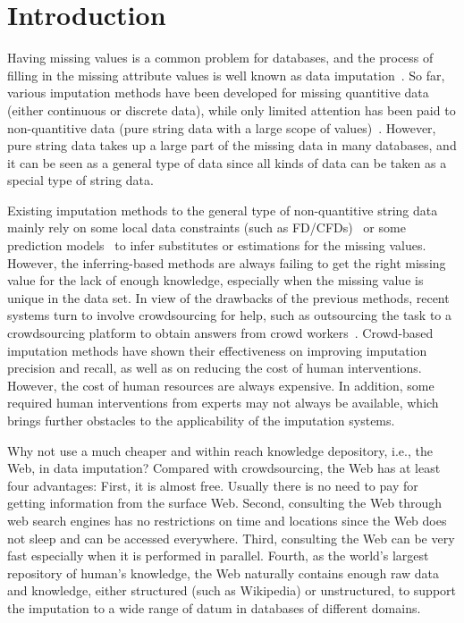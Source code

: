 \documentclass[sigconf]{acmart}
\begin{document}
%
%

\maketitle

\section{Introduction}

Having missing values is a common problem for databases, and the process of filling in the missing attribute values is well known as data imputation~\cite{li2012webput, wang2002empirical}. So far, various imputation methods have been developed for missing quantitive data (either continuous or discrete data), while only limited attention has been paid to non-quantitive data (pure string data with a large scope of values)~\cite{li2015trip}. However, pure string data takes up a large part of the missing data in many databases, and it can be seen as a general type of data since all kinds of data can be taken as a special type of string data.


Existing imputation methods to the general type of non-quantitive string data mainly rely on some local data constraints (such as FD/CFDs)~\cite{wu2004using, shen2007combined, bohannon2007conditional} or some prediction models~\cite{wang2002empirical, zhang2008parimputation} to infer substitutes or estimations for the missing values. However, the inferring-based methods are always failing to get the right missing value for the lack of enough knowledge, especially when the missing value is unique in the data set. In view of the drawbacks of the previous methods, recent systems turn to involve crowdsourcing for help, such as outsourcing the task to a crowdsourcing platform to obtain answers from crowd workers~\cite{ye2014capture, franklin2011crowddb}.
%
Crowd-based imputation methods have shown their effectiveness on improving imputation precision and recall, as well as on reducing the cost of human interventions. However, the cost of human resources are always expensive. In addition, some required human interventions from experts may not always be available, which brings further obstacles to the applicability of the imputation systems.


Why not use a much cheaper and within reach knowledge depository, i.e., the Web, in data imputation? Compared with crowdsourcing, the Web has at least four advantages: First, it is almost free. Usually there is no need to pay for getting information from the surface Web. Second, consulting the Web through web search engines has no restrictions on time and locations since the Web does not sleep and can be accessed everywhere. Third, consulting the Web can be very fast especially when it is performed in parallel. Fourth, as the world's largest repository of human's knowledge, the Web naturally contains enough raw data and knowledge, either structured (such as Wikipedia) or unstructured, to support the imputation to a wide range of datum in databases of different domains.
\end{document}
